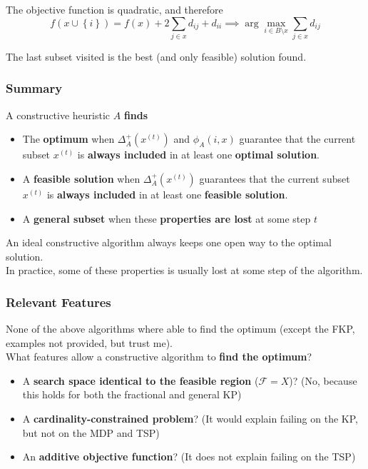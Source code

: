 The objective function is quadratic, and therefore
$$ f(x \cup \left\{i\right\}) = f(x) + 2 \sum_{j \in x} d_{ij} + d_{ii} \implies \arg \max_{i \in B \setminus x} \sum_{j \in x} d_{ij} $$

The last subset visited is the best (and only feasible) solution found.\\

\newpage

\subsubsection{Summary}
A constructive heuristic $A$ \textbf{finds}
\begin{itemize}
	\item The \textbf{optimum} when $\Delta_A^+ \left(x^{(t)}\right)$ and $\phi_A (i, x)$ guarantee that the current subset $x^{(t)}$ is \textbf{always included} in at least one \textbf{optimal solution}.\\
	
	\item A \textbf{feasible solution} when $\Delta_A^+ \left(x^{(t)}\right)$ guarantees that the current subset $x^{(t)}$ is \textbf{always included} in at least one \textbf{feasible solution}.\\
	
	\item A \textbf{general subset} when these \textbf{properties are lost} at some step $t$
\end{itemize}

An ideal constructive algorithm always keeps one open way to the optimal solution.\\

In practice, some of these properties is usually lost at some step of the algorithm.\\

\subsubsection{Relevant Features}
None of the above algorithms where able to find the optimum (except the FKP, examples not provided, but trust me).\\

What features allow a constructive algorithm to \textbf{find the optimum}? 
\begin{itemize}
	\item A \textbf{search space identical to the feasible region} ($\mathcal{F} = X$)? (No, because this holds for both the fractional and general KP)
	\item A \textbf{cardinality-constrained problem}? (It would explain failing on the KP, but not on the MDP and TSP)
	\item An \textbf{additive objective function}? (It does not explain failing on the TSP)
\end{itemize}

